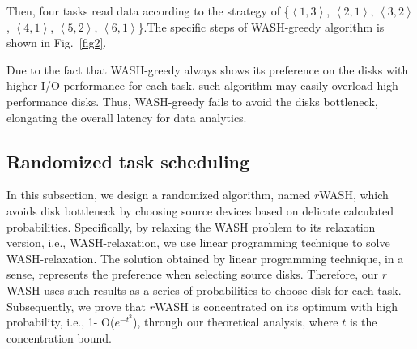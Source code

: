 \documentclass[conference]{IEEEtran}
\begin{document}
Then, four tasks read data according to the strategy of \{$\left \langle 1, 3\right \rangle$, $\left \langle 2, 1\right \rangle$,  $\left \langle 3, 2\right \rangle$, $\left \langle 4, 1\right \rangle$, $\left \langle 5, 2\right \rangle$, $\left \langle 6, 1\right \rangle$\}.The specific steps of WASH-greedy algorithm is shown in Fig.~\ref{fig2}.

Due to the fact that WASH-greedy always shows its preference on the disks with higher I/O performance for each task, such algorithm may easily overload high performance disks. Thus, WASH-greedy fails to  avoid the disks bottleneck, elongating the overall latency for data analytics.

\subsection{Randomized task scheduling}\label{Randomized}


In this subsection, we design a randomized algorithm, named $r$WASH, which avoids disk bottleneck by choosing source devices based on delicate calculated probabilities. Specifically, by relaxing the WASH problem to its relaxation version, i.e., WASH-relaxation, we use linear programming technique to solve WASH-relaxation. The solution obtained by linear programming technique, in a sense, represents the preference when selecting source disks. Therefore, our $r$WASH  uses such results as a series of probabilities to choose disk for each task. Subsequently, we prove that $r$WASH is concentrated on its optimum with high probability, i.e., 1- O($e^{-t^2}$), through our theoretical analysis, where $t$ is the concentration bound.
\end{document}
